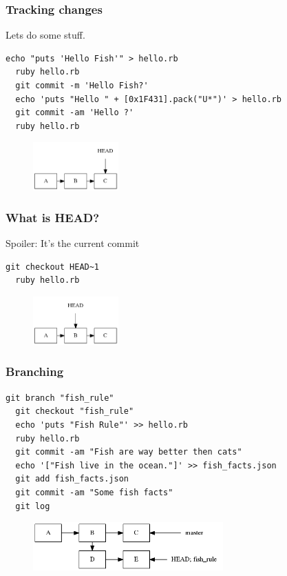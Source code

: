 \documentclass{beamer}
\begin{document}
\begin{frame}[fragile]
\frametitle{Tracking changes}

Lets do some stuff.

\vspace{1em}

\begin{lstlisting}[frame=single]
  echo "puts 'Hello Fish'" > hello.rb
  ruby hello.rb
  git commit -m 'Hello Fish?'
  echo 'puts "Hello " + [0x1F431].pack("U*")' > hello.rb
  git commit -am 'Hello ?'
  ruby hello.rb
\end{lstlisting}

\begin{figure}[p]
  \centering
  \includegraphics[height=5em]{some_commits.png}
\end{figure}

\end{frame}

\begin{frame}[fragile]
\frametitle{What is HEAD?}

Spoiler: It's the current commit

\vspace{1em}

\begin{lstlisting}[frame=single]
  git checkout HEAD~1
  ruby hello.rb
\end{lstlisting}

\begin{figure}[p]
  \centering
  \includegraphics[height=5em]{head.png}
\end{figure}

\end{frame}

\begin{frame}[fragile]
\frametitle{Branching}

\begin{lstlisting}[frame=single]
  git branch "fish_rule"
  git checkout "fish_rule"
  echo 'puts "Fish Rule"' >> hello.rb
  ruby hello.rb
  git commit -am "Fish are way better then cats"
  echo '["Fish live in the ocean."]' >> fish_facts.json
  git add fish_facts.json
  git commit -am "Some fish facts"
  git log
\end{lstlisting}

\begin{figure}[p]
  \centering
  \includegraphics[height=5em]{fish.png}
\end{figure}

\end{frame}
\end{document}
